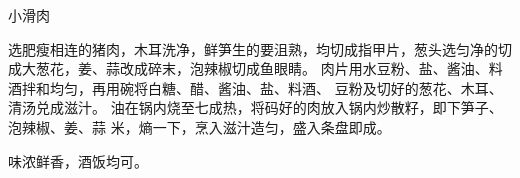 \begin{recipe}{小滑肉}

\ingredients


\cooking

\step 选肥瘦相连的猪肉，木耳洗净，鲜笋生的要沮熟，均切成指甲片，葱头选匀净的切
成大葱花，姜、蒜改成碎末，泡辣椒切成鱼眼睛。
\step 肉片用水豆粉、盐、酱油、料酒拌和均匀，再用碗将白糖、醋、酱油、盐、料酒、
豆粉及切好的葱花、木耳、清汤兑成滋汁。
\step 油在锅内烧至七成热，将码好的肉放入锅内炒散籽，即下笋子、泡辣椒、姜、蒜
米，熵一下，烹入滋汁造匀，盛入条盘即成。

\notes

味浓鲜香，酒饭均可。

\end{recipe}

